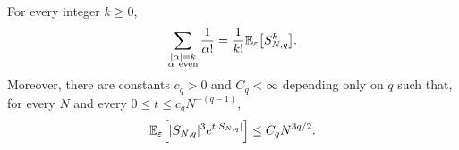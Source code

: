 \documentclass[../CLT_SYK.tex]{subfiles}
\begin{document}
\begin{lemma} \label{lem:Rademacher-encoding}
  For every integer $k \geq 0$,
  \begin{equation}
    \label{eq:even-sum-Rademacher-moment}
    \sum_{
      \substack{
        |\alpha|=k \\
        \alpha\ \mathrm{even}
      }
    }
    \frac{1}{\alpha!}
    =
      \frac{1}{k!}
      \E_\varepsilon\mleft[S_{N,q}^k\mright].
  \end{equation}
  Moreover, there are constants $c_q > 0$ and $C_q < \infty$ depending only on $q$ such that, for every $N$ and every $0 \leq t \leq c_q N^{-(q-1)}$,
  \begin{equation}
    \label{eq:Rademacher-exponential-moment}
    \E_\varepsilon\mleft[
      |S_{N,q}|^3
      e^{t |S_{N,q}|}
    \mright]
    \leq
      C_q N^{3q/2}.
  \end{equation}
\end{lemma}
\end{document}
